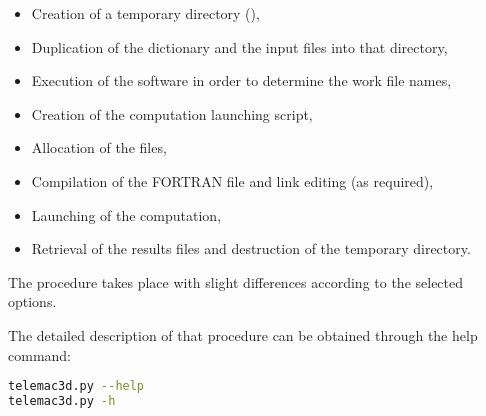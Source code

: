 \begin{itemize}
\item Creation of a temporary directory
(),

\item Duplication of the dictionary and the input files into that directory,

\item Execution of the \damo software in order to determine the work file names,

\item Creation of the computation launching script,

\item Allocation of the files,

\item Compilation of the FORTRAN file and link editing (as required),

\item Launching of the computation,

\item Retrieval of the results files and destruction of the temporary directory.
\end{itemize}

The procedure takes place with slight differences according to the selected
options.

The detailed description of that procedure can be obtained through the help
command:

\begin{lstlisting}[language=bash]
telemac3d.py --help
telemac3d.py -h
\end{lstlisting}

